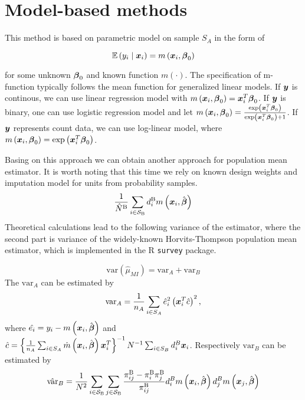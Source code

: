 \documentclass[
  letterpaper,
  DIV=11,
  numbers=noendperiod]{scrreprt}
\begin{document}
\section{Model-based methods}\label{model-based-methods}

This method is based on parametric model on sample \(S_A\) in the form
of

\[
\begin{equation}
\mathbb{E}\left(y_i \mid \bx_i\right) = m\left(\bx_i, \bbeta_{0}\right)
\end{equation}
\]

for some unknown \(\boldsymbol{\beta}_{0}\) and known function \(m(\cdot)\). The
specification of m-function typically follows the mean function for
generalized linear models. If \(\boldsymbol{y}\) is continous, we can use linear
regression model with
\(m\left(\boldsymbol{x}_i, \boldsymbol{\beta}_{0}\right) = \boldsymbol{x}_i^{T} \boldsymbol{\beta}_0\). If
\(\boldsymbol{y}\) is binary, one can use logistic regression model and let
\(m\left(\boldsymbol{x}_i, \boldsymbol{\beta}_{0}\right) = \frac{\exp\left( \boldsymbol{x}_i^{T} \boldsymbol{\beta}_0\right)}{\exp\left( \boldsymbol{x}_i^{T} \boldsymbol{\beta}_0\right) + 1}\).
If \(\boldsymbol{y}\) represents count data, we can use log-linear model, where
\(m\left(\boldsymbol{x}_i, \boldsymbol{\beta}_{0}\right) = \exp\left(\boldsymbol{x}_i^{T} \boldsymbol{\beta}_0\right)\).

Basing on this approach we can obtain another approach for population
mean estimator. It is worth noting that this time we rely on known
design weights and imputation model for units from probability samples.
\[
\begin{equation}
\frac{1}{\hat{N}^{\mathrm{B}}} \sum_{i \in \mathcal{S}_{\mathrm{B}}} d_i^{\mathrm{B}} m\left(\boldsymbol{x}_i, \hat{\bbeta}\right)
\end{equation}
\] Theoretical calculations lead to the following variance of the
estimator, where the second part is variance of the widely-known
Horvits-Thompson population mean estimator, which is implemented in the
R \texttt{survey} package.

\[
\text{var}\left(\hat{\mu}_{MI}\right) = \text{var}_A + \text{var}_B 
\] The \(\text{var}_A\) can be estimated by \[
\text{var}_A = \frac{1}{n_A} \sum_{i \in S_A} \hat{e}_i^2 \left(\boldsymbol{x}_i^{T} \hat{c}\right)^2,
\] where
\(\hat{e_i} = y_i - m\left(\boldsymbol{x}_i, \hat{\boldsymbol{\beta}}\right)\) and
\(\hat{c} = \left\{\frac{1}{n_A} \sum_{i \in S_A} \dot{m}\left(\boldsymbol{x}_i, \hat{\boldsymbol{\beta}}\right) \boldsymbol{x}_i^T \right\}^{-1} N^{-1} \sum_{i \in S_B} d_i^B \boldsymbol{x}_i\).
Respectively \(\text{var}_B\) can be estimated by \[
\hat{\text{var}}_B = \frac{1}{N^2} \sum_{i \in \mathcal{S}_{\mathrm{B}}} \sum_{j \in \mathcal{S}_{\mathrm{B}}} \frac{\pi_{i j}^{\mathrm{B}}-\pi_i^{\mathrm{B}} \pi_j^{\mathrm{B}}}{\pi_{i j}^{\mathrm{B}}} d_i^B m\left(\boldsymbol{x}_i, \hat{\boldsymbol{\beta}}\right) d_j^B m\left(\boldsymbol{x}_j, \hat{\boldsymbol{\beta}}\right)
\]
\end{document}
